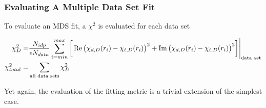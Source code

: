 \documentclass[10pt, xcolor=x11names, compress]{beamer}
\begin{document}
\begin{frame}
  \frametitle{Evaluating A Multiple Data Set Fit}

  To evaluate an MDS fit, a $\chi^2$ is evaluated for each data set
  
  {\small
    \begin{align}
      \chi^2_D =& \frac{N_{idp}}{\epsilon N_{data}}
      \sum\limits_{i=min}^{max} 
      \bigg[\Re\big(\chi_{d,D}(r_i)-\chi_{t,D}(r_i)\big)^2 + 
      \Im\big(\chi_{d,D}(r_i)-\chi_{t,D}(r_i)\big)^2\bigg]\Biggl|_{\mathrm{data\ set}}
      \notag \\
      \chi^2_{total} =& \sum\limits_{\textrm{all data sets}} \chi^2_D
    \end{align}}

  \begin{exampleblock}{}
    \begin{center}
      Yet again, the evaluation of the fitting metric is a trivial
      extension of the simplest case.
    \end{center}
  \end{exampleblock}
\end{frame}
\end{document}
